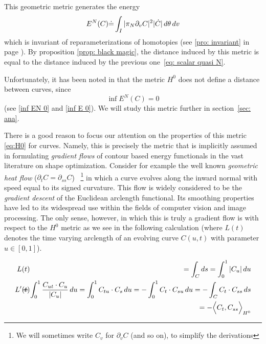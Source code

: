 \documentclass[twoside,a4paper,english]{article}
\def\derpar#1{\partial_{#1}}
\begin{document}
  This geometric metric generates the energy
  \begin{equation}
    E^N(C) \defeq \int_{I}  |\pi_N \derpar v C|^2 |\dot C| \, d\theta\,dv  
    \label{eq:EN}
  \end{equation}
  which is invariant of reparameterizations of homotopies
  (see \ref{pro: invariant} in page \pageref{pro: invariant}).
  By proposition \ref{prop: black magic},
  the distance induced by this metric is equal to 
  the distance induced by the previous one~\eqref{eq: scalar quasi N}.

  Unfortunately, it has been  noted in \cite{Mumford:Gibbs}
  that the metric $H^0$ does not define a distance between curves, since
  \[\inf E^N(C) =0\]
  (see \ref{inf EN 0} and \ref{inf E 0}).
  We will study this metric further in section~\ref{sec: ana}.

\smallskip

There is a good reason to focus our attention
on the properties of this metric \eqref {eq:H0} for curves. Namely,
this is precisely the metric that is implicitly assumed in formulating
{\it gradient flows} of contour based energy functionals in the vast
literature on shape optimization. Consider for example the well known
{\it geometric heat flow} ($\partial_t C=\partial_{ss} C$)~%
\footnote{
  We will sometimes write $C_v$ for $\derpar v C$ (and so on),
  to simplify the derivations
} 
in which a curve evolves along the inward
normal with speed equal to its signed curvature. This flow is widely
considered to be the {\it gradient descent} of the Euclidean arclength
functional. Its smoothing properties have led to its widespread use
within the fields of computer vision and image processing. The only
sense, however, in which this is truly a gradient flow is with respect
to the $H^0$ metric as we see in the following calculation
(where $L(t)$ denotes the time varying arclength of an evolving curve $C(u,t)$
with parameter $u\in[0,1]$).

\begin{eqnarray*}
  L(t)  &&\hspace{-2em}
    =\int_C ds = \int_0^1 |C_{u}| \, d{u} \\
  L'(t) &&\hspace{-2em}
    = \int_0^1 \frac{C_{u t}\cdot C_{u}}{|C_{u}|} \, d{u}
    = \int_0^1 C_{tu}\cdot C_s \,d{u}
    = -\int_0^1 C_t\cdot C_{su} \,d{u}
    = -\int_C C_t\cdot C_{ss} \,ds \\
  &&\hspace{-2em}
    = -\Big\langle C_t,C_{ss} \Big\rangle_{H^0}
\end{eqnarray*}
\end{document}
